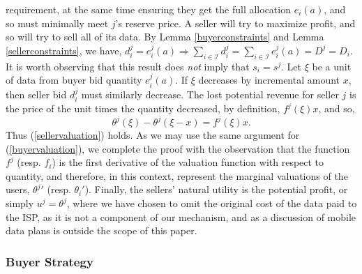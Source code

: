 \documentclass[12pt]{article}
\theoremstyle{definition}
\newcommand{\mcI}{\mathcal{I}}
\begin{document}
\begin{multicols}{2}
requirement, at the same time ensuring they get the full allocation $e_i(a)$,
and so must minimally meet $j$'s reserve price. 
A seller will try to maximize profit, 
and so will try to sell all of its data.  By Lemma
\ref{buyerconstraints} and Lemma \ref{sellerconstraints}, we have,
$d_i^j = e_i^j(a) \Rightarrow \sum_{i\in{\mcI}} d_i^j =
\sum_{i\in\mcI} e_i^j(a) = D^j = D_i$. It is worth observing that this result
does \emph{not} imply that $s_i=s^j$. Let $\xi$
be a unit of data from buyer bid quantity $e_i^j(a)$.
If $\xi$ decreases by incremental amount $x$, then seller bid $d_i^j$ must
similarly decrease. The lost potential revenue for seller $j$ is the price of
the unit times the quantity decreased, by definition, $f^j(\xi)x$, and so,
$$
    \theta^j(\xi) - \theta^j(\xi-x) = f^j(\xi)x.
$$
Thus (\ref{sellervaluation}) holds.
As we may use the same argument for (\ref{buyervaluation}), we complete the
proof with the observation that the function $f^j$ (resp. $f_i$) is the first
derivative of the valuation function with respect to
quantity, and therefore, in this context, represent the marginal valuations of the
users, ${\theta^j}'$ (resp. $\theta_i'$). Finally, the sellers' natural utility is the potential
profit, or simply $u^j = \theta^j$, where we have chosen to omit the original cost of the data
paid to the ISP, as it is not a component of our mechanism, and as a discussion
of mobile data plans is outside the scope of this paper.  

\subsubsection{Buyer Strategy}


\end{multicols}
\end{document}

